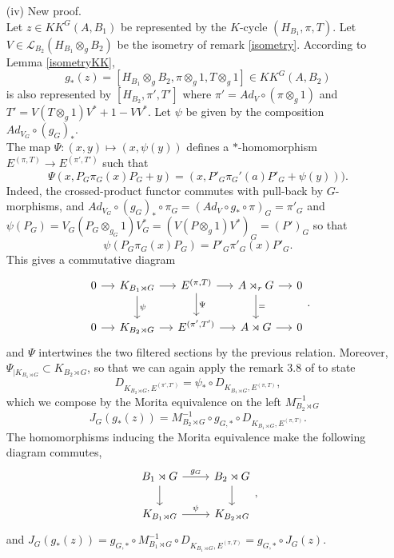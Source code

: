 \begin{dem}
\begin{enumerate}

\item[(iv)] New proof.\\
Let $z \in KK^G(A,B_1)$ be represented by the $K$-cycle $(H_{B_1},\pi,T)$. Let $V\in \mathcal L_{B_2}(H_{B_1}\otimes_g B_2)$ be the isometry of remark \ref{isometry}. According to Lemma \ref{isometryKK}, 
\[g_*(z)=[H_{B_1}\otimes_g B_2, \pi\otimes_g 1, T\otimes_g 1]\in KK^G(A,B_2)\] 
is also represented by $[H_{B_2}, \pi',T' ]$ where $\pi' = Ad_{V}\circ (\pi\otimes_g 1)$ and $T' = V(T\otimes_g 1)V^* +1-VV^*$. Let $\psi$ be given by the composition $Ad_{V_G}\circ (g_G)_*$.\\
The map $\Psi :(x,y)\mapsto (x, \psi(y))$ defines a $*$-homomorphism $E^{(\pi,T)} \rightarrow E^{(\pi',T')}$ such that 
\[\Psi(x,P_G\pi_G(x)P_G +y)= (x, P'_G  \pi_G'(a)P'_G + \psi(y)) ).\] 
Indeed, the crossed-product functor commutes with pull-back by $G$-morphisms, and $Ad_{V_G}\circ(g_G)_*\circ\pi_G= (Ad_V\circ g_* \circ \pi)_G = \pi'_G$ and $\psi(P_G)= V_G (P_G\otimes_{g_G} 1)V^*_G = (V(P\otimes_g 1 ) V^*)_G = (P')_G$ so that 
\[\psi(P_G \pi_G(x) P_G)=P'_G \pi'_G(x) P'_G. \]
This gives a commutative diagram 
\[\begin{tikzcd}[column sep = small]
0\arrow{r} & K_{B_1\rtimes G}\arrow{r}\arrow{d}{\psi} & E^{(\pi,T)} \arrow{r}\arrow{d}{\Psi}& A\rtimes_r G\arrow{r}\arrow{d}{=} & 0\\
0\arrow{r} & K_{B_2\rtimes G}\arrow{r} & E^{(\pi',T')} \arrow{r}& A\rtimes G\arrow{r} & 0
\end{tikzcd}.\]
and $\Psi$ intertwines the two filtered sections by the previous relation. Moreover, $\Psi_{|K_{B_1\rtimes G}}\subset K_{B_2\rtimes G}$, so that we can again apply the remark $3.8$ of \cite{OY2} to state
\[ D_{K_{B_2\rtimes G},E^{(\pi',T')}}=\psi_*\circ D_{K_{B_1\rtimes G},E^{(\pi,T)}},\]
which we compose by the Morita equivalence on the left $M_{B_2\rtimes G}^{-1}$
\[J_G(g_*(z)) = M_{B_2\rtimes G}^{-1}\circ g_{G,*}\circ D_{K_{B_1\rtimes G},E^{(\pi,T)}}.\]
The homomorphisms inducing the Morita equivalence make the following diagram commutes,
\[\begin{tikzcd}B_1\rtimes G\arrow{r}{g_G}\arrow{d} & B_2\rtimes G\arrow{d} \\ K_{B_1\rtimes G } \arrow{r}{\psi}& K_{B_2\rtimes G }\end{tikzcd},\]
and $J_G(g_*(z))= g_{G,*}\circ M_{B_1\rtimes G}^{-1}\circ D_{K_{B_1\rtimes G},E^{(\pi,T)}}=g_{G,*}\circ J_G(z)$.\\


\end{enumerate}
\end{dem}
